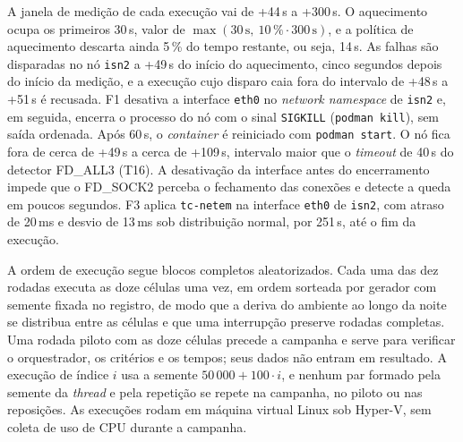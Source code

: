 A janela de medição de cada execução vai de +44\,s a +300\,s. O aquecimento ocupa os primeiros 30\,s, valor de $\max(30\,\text{s},\ 10\,\% \cdot 300\,\text{s})$, e a política de aquecimento descarta ainda 5\,\% do tempo restante, ou seja, 14\,s. As falhas são disparadas no nó \texttt{isn2} a +49\,s do início do aquecimento, cinco segundos depois do início da medição, e a execução cujo disparo caia fora do intervalo de +48\,s a +51\,s é recusada. F1 desativa a interface \texttt{eth0} no \emph{network namespace} de \texttt{isn2} e, em seguida, encerra o processo do nó com o sinal \texttt{SIGKILL} (\texttt{podman kill}), sem saída ordenada. Após 60\,s, o \emph{container} é reiniciado com \texttt{podman start}. O nó fica fora de cerca de +49\,s a cerca de +109\,s, intervalo maior que o \emph{timeout} de 40\,s do detector FD\_ALL3 (T16). A desativação da interface antes do encerramento impede que o FD\_SOCK2 perceba o fechamento das conexões e detecte a queda em poucos segundos. F3 aplica \texttt{tc-netem} na interface \texttt{eth0} de \texttt{isn2}, com atraso de 20\,ms e desvio de 13\,ms sob distribuição normal, por 251\,s, até o fim da execução.

A ordem de execução segue blocos completos aleatorizados. Cada uma das dez rodadas executa as doze células uma vez, em ordem sorteada por gerador com semente fixada no registro, de modo que a deriva do ambiente ao longo da noite se distribua entre as células e que uma interrupção preserve rodadas completas. Uma rodada piloto com as doze células precede a campanha e serve para verificar o orquestrador, os critérios e os tempos; seus dados não entram em resultado. A execução de índice $i$ usa a semente $50\,000 + 100 \cdot i$, e nenhum par formado pela semente da \emph{thread} e pela repetição se repete na campanha, no piloto ou nas reposições. As execuções rodam em máquina virtual Linux sob Hyper-V, sem coleta de uso de CPU durante a campanha.

